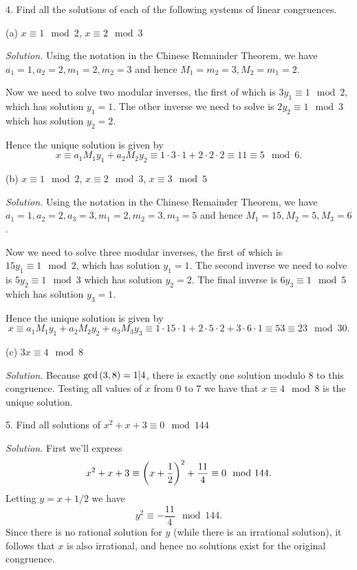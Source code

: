 \documentclass{article}
\begin{document}
\newpage

4. Find all the solutions of each of the following systems of linear
congruences.

(a) $x \equiv 1 \mod 2$, $x \equiv 2 \mod 3$

\textit{Solution.}
Using the notation in the Chinese Remainder Theorem, we have
$a_1 = 1, a_2 = 2, m_1 = 2, m_2 = 3$ and hence
$M_1 = m_2 = 3, M_2 = m_1 = 2$.

Now we need to solve two modular inverses, the first of which
is $3 y_1 \equiv 1 \mod 2$, which has solution $y_1 = 1$.
The other inverse we need to solve is $2 y_2 \equiv 1 \mod 3$
which has solution $y_2 = 2$.

Hence the unique solution is given by
%
\begin{equation*}
    x
    \equiv a_1 M_1 y_1 + a_2 M_2 y_2
    \equiv 1 \cdot 3 \cdot 1 + 2 \cdot 2 \cdot 2
    \equiv 11
    \equiv 5
    \mod 6
    .
\end{equation*}

\vspace{5mm}

(b) $x \equiv 1 \mod 2$, $x \equiv 2 \mod 3$, $x \equiv 3 \mod 5$

\textit{Solution.}
Using the notation in the Chinese Remainder Theorem, we have
$a_1 = 1, a_2 = 2, a_3 = 3, m_1 = 2, m_2 = 3, m_3 = 5$ and hence
$M_1 = 15, M_2 = 5, M_3 = 6$.

Now we need to solve three modular inverses, the first of which
is $15 y_1 \equiv 1 \mod 2$, which has solution $y_1 = 1$.
The second inverse we need to solve is $5 y_2 \equiv 1 \mod 3$ which has
solution $y_2 = 2$. The final inverse is $6 y_3 \equiv 1 \mod 5$ which
has solution $y_3 = 1$.

Hence the unique solution is given by
%
\begin{equation*}
    x
    \equiv a_1 M_1 y_1 + a_2 M_2 y_2 + a_3 M_3 y_3
    \equiv 1 \cdot 15 \cdot 1 + 2 \cdot 5 \cdot 2 + 3 \cdot 6 \cdot 1
    \equiv 53
    \equiv 23
    \mod 30
    .
\end{equation*}

\vspace{5mm}

(c) $3x \equiv 4 \mod 8$

\textit{Solution.}
Because $\gcd\del{3, 8} = 1 | 4$, there is exactly one solution modulo $8$
to this congruence. Testing all values of $x$ from $0$ to $7$ we have
that $x \equiv 4 \mod 8$ is the unique solution.

\newpage

5. Find all solutions of $x^2 + x + 3 \equiv 0 \mod 144$

\textit{Solution.}
First we'll express
%
\begin{equation*}
    x^2 + x + 3 \equiv \del{x + \frac{1}{2}}^2 + \frac{11}{4} \equiv 0 \mod 144
    .
\end{equation*}
%
Letting $y = x + 1/2$ we have
%
\begin{equation*}
    y^2 \equiv - \frac{11}{4} \mod 144
    .
\end{equation*}
%
Since there is no rational solution for $y$ (while there is an
irrational solution), it follows that $x$ is also irrational, and hence
no solutions exist for the original congruence.
\end{document}
